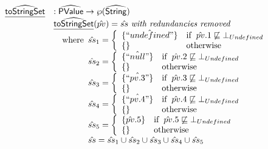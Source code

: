 \[\begin{array}{ll}
\widehat{\underline{\sf toStringSet}} & : \widehat{\mbox{\textsf{PValue}}} \rightarrow \wp(\widehat{\mbox{\textsf{String}}}) \\
& \widehat{\underline{\sf toStringSet}}(\hat{pv})
  = \hat{ss} ~ \textit{with redundancies removed}\\
& \quad{\rm where}\begin{array}[t]{l}
  \hat{ss}_1 = 
    \left\{\begin{array}{ll}
      \{ \hat{``undefined"} \} & {\rm if}\begin{array}[t]{l}\hat{pv}.1\not\sqsubseteq\bot_{Undefined}\end{array} \\
      \{\} & {\rm otherwise} \\
    \end{array}\right. \\
  \hat{ss}_2 = 
    \left\{\begin{array}{ll}
      \{ \hat{``null"} \} & {\rm if}\begin{array}[t]{l}\hat{pv}.2\not\sqsubseteq\bot_{Undefined}\end{array} \\
      \{\} & {\rm otherwise} \\
    \end{array}\right. \\
  \hat{ss}_3 = 
    \left\{\begin{array}{ll}
      \{ \hat{``pv.3"} \} & {\rm if}\begin{array}[t]{l}\hat{pv}.3\not\sqsubseteq\bot_{Undefined}\end{array} \\
      \{\} & {\rm otherwise} \\
    \end{array}\right. \\
  \hat{ss}_4 = 
    \left\{\begin{array}{ll}
      \{ \hat{``pv.4"} \} & {\rm if}\begin{array}[t]{l}\hat{pv}.4\not\sqsubseteq\bot_{Undefined}\end{array} \\
      \{\} & {\rm otherwise} \\
    \end{array}\right. \\
  \hat{ss}_5 = 
    \left\{\begin{array}{ll}
      \{ \hat{pv}.5 \} & {\rm if}\begin{array}[t]{l}\hat{pv}.5\not\sqsubseteq\bot_{Undefined}\end{array} \\
      \{\} & {\rm otherwise} \\
    \end{array}\right. \\
  \hat{ss} = \hat{ss}_1\cup\hat{ss}_2\cup\hat{ss}_3\cup\hat{ss}_4\cup\hat{ss}_5
\end{array}\\
\\


\end{array}\]

